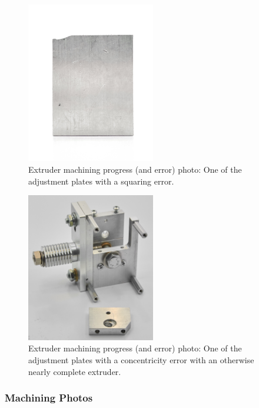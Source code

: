 
\begin{figure}[h!]
\centering
\includegraphics[width=0.5\textwidth]{./figures/extruder-mistake-1}
\caption{Extruder machining progress (and error) photo: One of the adjustment plates with a squaring error.}
\label{fig:extruder-mistake-1}
\end{figure}

\begin{figure}[h!]
\centering
\includegraphics[width=0.5\textwidth]{./figures/extruder-mistake-2}
\caption{Extruder machining progress (and error) photo: One of the adjustment plates with a concentricity error with an otherwise nearly complete extruder.}
\label{fig:extruder-mistake-2}
\end{figure}

\clearpage

\subsubsection{Machining Photos}

